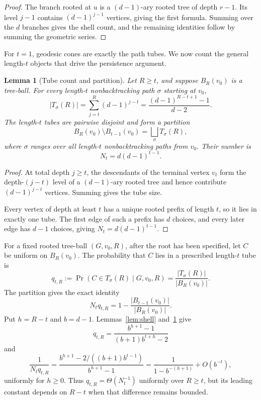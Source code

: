 \documentclass[11pt]{amsart}
\newtheorem{lemma}[theorem]{Lemma}
\theoremstyle{definition}
\begin{document}
\begin{proof}
The branch rooted at $u$ is a $(d-1)$-ary rooted tree of depth $r-1$. Its level $j-1$ contains $(d-1)^{j-1}$ vertices, giving the first formula. Summing over the $d$ branches gives the shell count, and the remaining identities follow by summing the geometric series.
\end{proof}

For $t=1$, geodesic cones are exactly the path tubes. We now count the general length-$t$ objects that drive the persistence argument.


\begin{lemma}[Tube count and partition]
\label{lem:tube-partition}
Let $R\geq t$, and suppose $B_R(v_0)$ is a tree-ball. For every length-$t$ nonbacktracking path $\sigma$ starting at $v_0$,
\[
|T_\sigma(R)|
=\sum_{j=t}^R(d-1)^{j-t}
=\frac{(d-1)^{R-t+1}-1}{d-2}.
\]
The length-$t$ tubes are pairwise disjoint and form a partition
\[
B_R(v_0)\setminus B_{t-1}(v_0)
=\bigsqcup_{\sigma}T_\sigma(R),
\]
where $\sigma$ ranges over all length-$t$ nonbacktracking paths from $v_0$. Their number is
\[
N_t=d(d-1)^{t-1}.
\]
\end{lemma}

\begin{proof}
At total depth $j\geq t$, the descendants of the terminal vertex $v_t$ form the depth-$(j-t)$ level of a $(d-1)$-ary rooted tree and hence contribute $(d-1)^{j-t}$ vertices. Summing gives the tube size.

Every vertex of depth at least $t$ has a unique rooted prefix of length $t$, so it lies in exactly one tube. The first edge of such a prefix has $d$ choices, and every later edge has $d-1$ choices, giving $N_t=d(d-1)^{t-1}$.
\end{proof}

For a fixed rooted tree-ball $(G,v_0,R)$, after the root has been specified, let $C$ be uniform on $B_R(v_0)$. The probability that $C$ lies in a prescribed length-$t$ tube is
\[
q_{t,R}:=\Pr(C\in T_\sigma(R)\mid G,v_0,R)
=\frac{|T_\sigma(R)|}{|B_R(v_0)|}.
\]
The partition gives the exact identity
\begin{equation}
\label{eq:tube-mass}
N_tq_{t,R}
=1-\frac{|B_{t-1}(v_0)|}{|B_R(v_0)|}.
\end{equation}
Put $h=R-t$ and $b=d-1$. Lemmas~\ref{lem:shell} and~\ref{lem:tube-partition} give
\[
q_{t,R}=\frac{b^{h+1}-1}{(b+1)b^{t+h}-2}
\]
and
\[
\frac{1}{N_tq_{t,R}}
=\frac{b^{h+1}-2/((b+1)b^{t-1})}{b^{h+1}-1}
=\frac{1}{1-b^{-(h+1)}}+O(b^{-t}),
\]
uniformly for $h\geq0$. Thus $q_{t,R}=\Theta(N_t^{-1})$ uniformly over $R\geq t$, but its leading constant depends on $R-t$ when that difference remains bounded.
\end{document}
